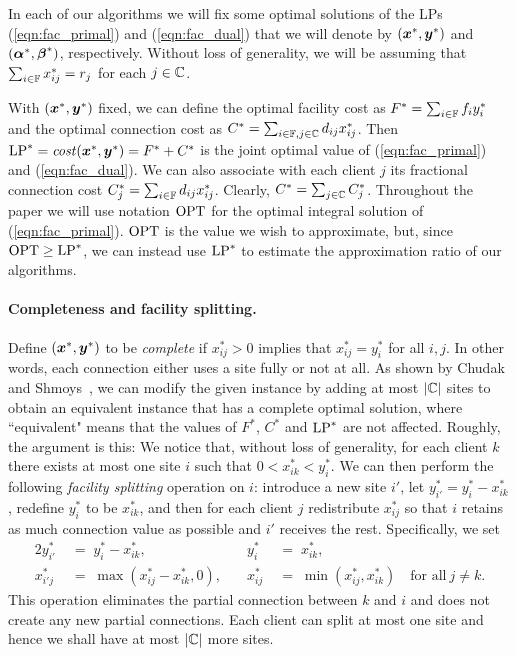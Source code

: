 \documentclass[11pt]{article}
\begin{document}
In each of our algorithms we will fix some optimal
solutions of the LPs (\ref{eqn:fac_primal}) and (\ref{eqn:fac_dual})
that we will denote by $(\boldsymbol{x}^\ast, \boldsymbol{y}^\ast)$ and
$(\boldsymbol{\alpha}^\ast,\boldsymbol{\beta}^\ast)$, respectively. Without loss of generality, we
will be assuming that $\sum_{i\in \mathbb{F}} x^\ast_{ij} = r_j$ for each 
$j\in\mathbb{C}$.

With $(\boldsymbol{x}^\ast, \boldsymbol{y}^\ast)$ fixed, we can define the
optimal facility cost as $F^\ast=\sum_{i\in\mathbb{F}} f_i
y_i^\ast$ and the optimal connection cost as $C^\ast =
\sum_{i\in\mathbb{F},j\in\mathbb{C}} d_{ij}x_{ij}^\ast$.
Then $\mbox{\rm LP}^\ast = {\it cost}(\boldsymbol{x}^\ast,\boldsymbol{y}^\ast) = F^\ast+C^\ast$
is the joint optimal value of (\ref{eqn:fac_primal}) and
(\ref{eqn:fac_dual}).  We can also associate with each
client $j$ its fractional connection cost $C^\ast_j =
\sum_{i\in\mathbb{F}} d_{ij}x_{ij}^\ast$.  Clearly, $C^\ast =
\sum_{j\in\mathbb{C}} C^\ast_j$.  Throughout the paper we
will use notation $\mbox{\rm OPT}$ for the optimal integral solution
of (\ref{eqn:fac_primal}).  $\mbox{\rm OPT}$ is the value we wish to
approximate, but, since $\mbox{\rm OPT}\ge\mbox{\rm LP}^\ast$, we can instead use
$\mbox{\rm LP}^\ast$ to estimate the approximation ratio of our
algorithms.


\paragraph{Completeness and facility splitting.}
Define $(\boldsymbol{x}^\ast, \boldsymbol{y}^\ast)$ to be \emph{complete} if
$x_{ij}^\ast>0$ implies that $x_{ij}^\ast=y_i^\ast$ for all
$i,j$. In other words, each connection either uses a site
fully or not at all.  As shown by Chudak and
Shmoys~\cite{ChudakS04}, we can modify the given instance by
adding at most $|\mathbb{C}|$ sites to obtain an equivalent
instance that has a complete optimal solution, where
``equivalent" means that the values of $F^\ast$, $C^\ast$ and
$\mbox{\rm LP}^\ast$ are not affected. Roughly, the
argument is this: We notice that, without loss of
generality, for each client $k$ there exists at most one
site $i$ such that $0 < x_{ik}^\ast < y_i^\ast$.  We can
then perform the following \emph{facility splitting}
operation on $i$: introduce a new site $i'$, let
$y^\ast_{i'} = y^\ast_i - x^\ast_{ik}$, redefine $y^\ast_i$
to be $x^\ast_{ik}$, and then for each client $j$
redistribute $x^\ast_{ij}$ so that $i$ retains as much
connection value as possible and $i'$ receives the
rest. Specifically, we set
%
\begin{alignat*}{2}
  y^\ast_{i'} \;&=\; y^\ast_i - x^\ast_{ik},  & y^\ast_{i} \;&=\; x^\ast_{ik},
	\\
  x^\ast_{i'j} \;&=\;\max( x^\ast_{ij} - x^\ast_{ik}, 0 ),\quad	& x^\ast_{ij} \;&=\; \min( x^\ast_{ij} , x^\ast_{ik}) 
			\quad	\textrm{for all}\ j \neq k.
\end{alignat*}
%
This operation eliminates the partial connection between $k$ and $i$ and does not create
any new partial connections. Each client can split at
most one site and hence we shall have at most $|\mathbb{C}|$ more sites.
\end{document}

